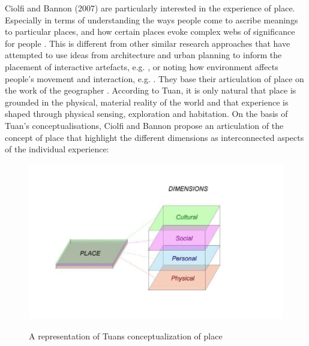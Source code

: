 Ciolfi and Bannon (2007) are particularly interested in the experience of place. Especially in terms of understanding the ways people come to ascribe meanings to particular places, and how certain places evoke complex webs of significance for people \autocite[p. 160]{hybridplace_ciolfi}. This is different from other similar research approaches that have attempted to use ideas from architecture and urban planning to inform the placement of interactive artefacts, e.g. \autocite{Cullen_book}, or noting how environment affects people's movement and interaction, e.g. \autocite{Alexander_book}. They base their articulation of place on the work of the geographer \autocite{Tuan_book}. According to Tuan, it is only natural that place is grounded in the physical, material reality of the world and that experience is shaped through physical sensing, exploration and habitation. On the basis of Tuan's conceptualisations, Ciolfi and Bannon propose an articulation of the concept of place that highlight the different dimensions as interconnected aspects of the individual experience:


\begin{figure}[H]
\includegraphics[width=12cm]{pictures/tuans_dimensions.png}
\caption{A representation of Tuans conceptualization of place}
\centering 
\autocite[p. 224]{spaceplace_ciolfi}
\end{figure}

